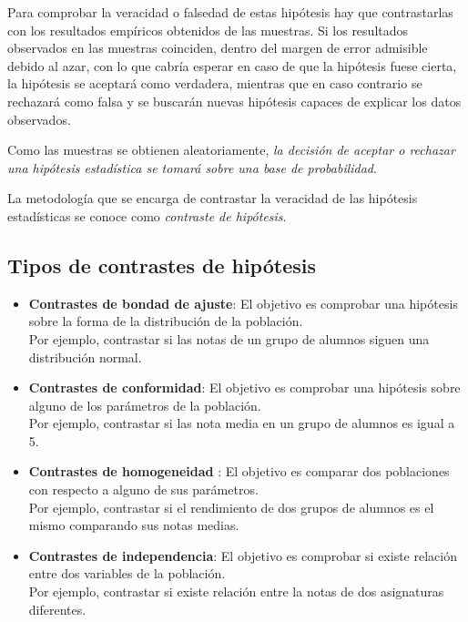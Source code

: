 \documentclass[
  a4paper,
]{scrreport}
\theoremstyle{definition}
\theoremstyle{definition}
\theoremstyle{plain}
\theoremstyle{remark}
\begin{document}
Para comprobar la veracidad o falsedad de estas hipótesis hay que
contrastarlas con los resultados empíricos obtenidos de las muestras. Si
los resultados observados en las muestras coinciden, dentro del margen
de error admisible debido al azar, con lo que cabría esperar en caso de
que la hipótesis fuese cierta, la hipótesis se aceptará como verdadera,
mientras que en caso contrario se rechazará como falsa y se buscarán
nuevas hipótesis capaces de explicar los datos observados.

Como las muestras se obtienen aleatoriamente, \emph{la decisión de
aceptar o rechazar una hipótesis estadística se tomará sobre una base de
probabilidad}.

La metodología que se encarga de contrastar la veracidad de las
hipótesis estadísticas se conoce como \emph{contraste de hipótesis}.

\hypertarget{tipos-de-contrastes-de-hipuxf3tesis}{%
\subsection{Tipos de contrastes de
hipótesis}\label{tipos-de-contrastes-de-hipuxf3tesis}}

\begin{itemize}
\item
  \textbf{Contrastes de bondad de ajuste}: El objetivo es comprobar una
  hipótesis sobre la forma de la distribución de la población.\\
  Por ejemplo, contrastar si las notas de un grupo de alumnos siguen una
  distribución normal.
\item
  \textbf{Contrastes de conformidad}: El objetivo es comprobar una
  hipótesis sobre alguno de los parámetros de la población.\\
  Por ejemplo, contrastar si las nota media en un grupo de alumnos es
  igual a 5.
\item
  \textbf{Contrastes de homogeneidad} : El objetivo es comparar dos
  poblaciones con respecto a alguno de sus parámetros.\\
  Por ejemplo, contrastar si el rendimiento de dos grupos de alumnos es
  el mismo comparando sus notas medias.
\item
  \textbf{Contrastes de independencia}: El objetivo es comprobar si
  existe relación entre dos variables de la población.\\
  Por ejemplo, contrastar si existe relación entre la notas de dos
  asignaturas diferentes.
\end{itemize}
\end{document}
